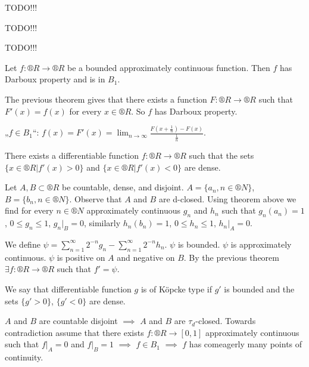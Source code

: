 \documentclass[12pt]{article}					%
\begin{document}

TODO!!!


TODO!!!


TODO!!!


\begin{dusledek}
	Let $f: ®R \rightarrow ®R$ be a bounded approximately continuous function. Then $f$ has Darboux property and is in $B_1$.

	\begin{dukazin}
		The previous theorem gives that there exists a function $F: ®R \rightarrow ®R$ such that $F'(x) = f(x)$ for every $x \in ®R$. So $f$ has Darboux property.

		„$f \in B_1$“: $f(x) = F'(x) = \lim_{n \rightarrow ∞} \frac{F(x + \frac{1}{n}) - F(x)}{\frac{1}{n}}$.
	\end{dukazin}
\end{dusledek}

\begin{veta}
	There exists a differentiable function $f: ®R \rightarrow ®R$ such that the sets $\{x \in ®R | f'(x) > 0\}$ and $\{x \in ®R | f'(x) < 0\}$ are dense.

	\begin{dukazin}
		Let $A, B \subset ®R$ be countable, dense, and disjoint. $A = \{a_n, n \in ®N\}$, $B = \{b_n, n \in ®N\}$. Observe that $A$ and $B$ are d-closed. Using theorem above we find for every $n \in ®N$ approximately continuous $g_n$ and $h_n$ such that $g_n(a_n) = 1$, $0 ≤ g_n ≤ 1$, $g_n|_B = 0$, similarly $h_n(b_n) = 1$, $0 ≤ h_n ≤ 1$, $h_n|_A = 0$.

		We define $ψ = \sum_{n=1}^∞ 2^{-n} g_n - \sum_{n=1}^∞ 2^{-n} h_n$. $ψ$ is bounded. $ψ$ is approximately continuous. $ψ$ is positive on $A$ and negative on $B$. By the previous theorem $\exists f: ®R \rightarrow ®R$ such that $f' = ψ$.
	\end{dukazin}
\end{veta}

\begin{poznamka}
	We say that differentiable function $g$ is of Köpcke type if $g'$ is bounded and the sets $\{g' > 0\}$, $\{g' < 0\}$ are dense.
\end{poznamka}

\begin{poznamka}
	$A$ and $B$ are countable disjoint $\implies$ $A$ and $B$ are $τ_d$-closed. Towards contradiction assume that there exists $f: ®R \rightarrow [0, 1]$ approximately continuous such that $f|_A = 0$ and $f|_B = 1$ $\implies$ $f \in B_1$ $\implies$ $f$ has comeagerly many points of continuity.
\end{poznamka}
\end{document}
